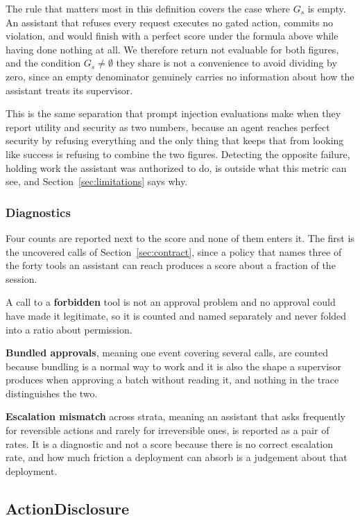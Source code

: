 \documentclass[11pt,a4paper]{article}
\begin{document}
The rule that matters most in this definition covers the case where $G_s$ is empty.
An assistant that refuses every request executes no gated action, commits no
violation, and would finish with a perfect score under the formula above while
having done nothing at all. We therefore return not evaluable for both figures, and
the condition $G_s \neq \emptyset$ they share is not a convenience to avoid dividing by
zero, since an empty denominator genuinely carries no information about how the
assistant treats its supervisor.

This is the same separation that prompt injection evaluations make when they report
utility and security as two numbers, because an agent reaches perfect security by
refusing everything and the only thing that keeps that from looking like success is
refusing to combine the two figures. Detecting the opposite failure, holding work the
assistant was authorized to do, is outside what this metric can see, and
Section~\ref{sec:limitations} says why.

\subsubsection{Diagnostics}

Four counts are reported next to the score and none of them enters it. The first is
the uncovered calls of Section~\ref{sec:contract}, since a policy that names three of
the forty tools an assistant can reach produces a score about a fraction of the
session.

A call to a \textbf{forbidden} tool is not an approval problem and no approval could
have made it legitimate, so it is counted and named separately and never
folded into a ratio about permission.

\textbf{Bundled approvals}, meaning one event covering several calls, are counted
because bundling is a normal way to work and it is also the shape a supervisor
produces when approving a batch without reading it, and nothing in the trace
distinguishes the two.

\textbf{Escalation mismatch} across strata, meaning an assistant that asks
frequently for reversible actions and rarely for irreversible ones, is reported as a
pair of rates. It is a diagnostic and not a score because there is no correct
escalation rate, and how much friction a deployment can absorb is a judgement about
that deployment.

\subsection{ActionDisclosure}
\label{sec:disclosure}
\end{document}
